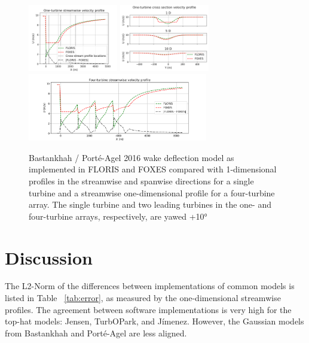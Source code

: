 \documentclass{iopconfser}
\begin{document}
\begin{figure}[]
\centering
\includegraphics[width=0.35\textwidth]{figures/b2016 deflection 1t x.png}
\includegraphics[width=0.35\textwidth]{figures/b2016 deflection 1t y.png}
\\
\includegraphics[width=0.7\textwidth]{figures/b2016 deflection 4t.png}
\caption{Bastankhah / Porté-Agel 2016 wake deflection model as implemented in FLORIS and FOXES compared with 1-dimensional profiles in the streamwise and spanwise directions for a single turbine and a streamwise one-dimensional profile for a four-turbine array.
The single turbine and two leading turbines in the one- and four-turbine arrays, respectively, are yawed +10°}
\label{fig:b2016_deflection}
\end{figure}

\section{Discussion} \label{discussion}

The L2-Norm of the differences between implementations of common models is listed in Table ~\ref{tab:error}, as measured by the one-dimensional streamwise profiles.
The agreement between software implementations is very high for the top-hat models: Jensen, TurbOPark, and Jímenez.
However, the Gaussian models from Bastankhah and Porté-Agel are less aligned.
\end{document}
